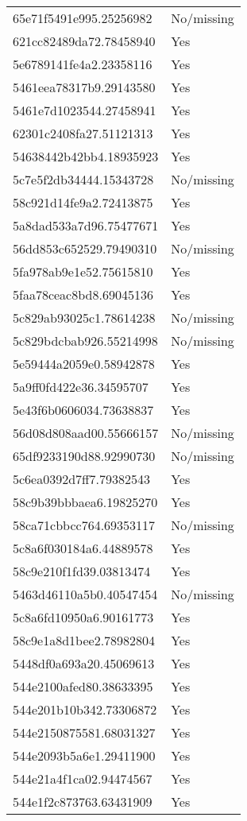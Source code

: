 \begin{tabular}{ll}
65e71f5491e995.25256982 & No/missing \\
621cc82489da72.78458940 & Yes \\
5e6789141fe4a2.23358116 & Yes \\
5461eea78317b9.29143580 & Yes \\
5461e7d1023544.27458941 & Yes \\
62301c2408fa27.51121313 & Yes \\
54638442b42bb4.18935923 & Yes \\
5c7e5f2db34444.15343728 & No/missing \\
58c921d14fe9a2.72413875 & Yes \\
5a8dad533a7d96.75477671 & Yes \\
56dd853c652529.79490310 & No/missing \\
5fa978ab9e1e52.75615810 & Yes \\
5faa78ceac8bd8.69045136 & Yes \\
5c829ab93025c1.78614238 & No/missing \\
5c829bdcbab926.55214998 & No/missing \\
5e59444a2059e0.58942878 & Yes \\
5a9ff0fd422e36.34595707 & Yes \\
5e43f6b0606034.73638837 & Yes \\
56d08d808aad00.55666157 & No/missing \\
65df9233190d88.92990730 & No/missing \\
5c6ea0392d7ff7.79382543 & Yes \\
58c9b39bbbaea6.19825270 & Yes \\
58ca71cbbcc764.69353117 & No/missing \\
5c8a6f030184a6.44889578 & Yes \\
58c9e210f1fd39.03813474 & Yes \\
5463d46110a5b0.40547454 & No/missing \\
5c8a6fd10950a6.90161773 & Yes \\
58c9e1a8d1bee2.78982804 & Yes \\
5448df0a693a20.45069613 & Yes \\
544e2100afed80.38633395 & Yes \\
544e201b10b342.73306872 & Yes \\
544e2150875581.68031327 & Yes \\
544e2093b5a6e1.29411900 & Yes \\
544e21a4f1ca02.94474567 & Yes \\
544e1f2c873763.63431909 & Yes \\

\end{tabular}
